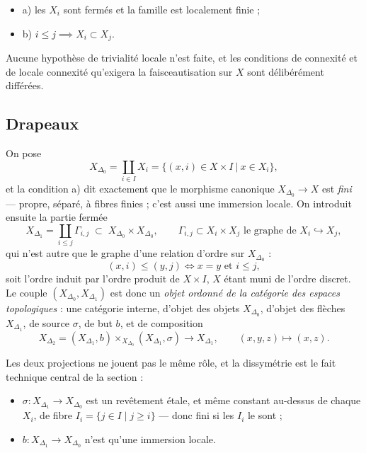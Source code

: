 \documentclass[11pt,a4paper]{article}
\begin{document}
\begin{itemize}
\item a) les $X_{i}$ sont fermés et la famille est localement finie ;
\item b) $i \leq j \implies X_{i} \subset X_{j}$.
\end{itemize}

Aucune hypothèse de trivialité locale n'est faite, et les conditions de connexité
et de locale connexité qu'exigera la faisceautisation sur $X$ sont
délibérément différées.

\subsection*{Drapeaux}

On pose
\[
  X_{\Delta_{0}} = \coprod_{i \in I} X_{i}
  = \bigl\{ (x,i) \in X \times I \ \big|\ x \in X_{i} \bigr\},
\]
et la condition a) dit exactement que le morphisme canonique
$X_{\Delta_{0}} \to X$ est \emph{fini} — propre, séparé, à fibres finies ; c'est
aussi une immersion locale. On introduit ensuite la partie fermée
\[
  X_{\Delta_{1}} = \coprod_{i \leq j} \Gamma_{i,j}
  \;\subset\; X_{\Delta_{0}} \times X_{\Delta_{0}},
  \qquad \Gamma_{i,j} \subset X_{i} \times X_{j}
  \text{ le graphe de } X_{i} \hookrightarrow X_{j},
\]
qui n'est autre que le graphe d'une relation d'ordre sur $X_{\Delta_{0}}$ :
\[
  (x,i) \leq (y,j) \iff x = y \text{ et } i \leq j,
\]
soit l'ordre induit par l'ordre produit de $X \times I$, $X$ étant muni de
l'ordre discret. Le couple $(X_{\Delta_{0}}, X_{\Delta_{1}})$ est donc un
\emph{objet ordonné de la catégorie des espaces topologiques} : une catégorie
interne, d'objet des objets $X_{\Delta_{0}}$, d'objet des flèches
$X_{\Delta_{1}}$, de source $\sigma$, de but $b$, et de composition
\[
  X_{\Delta_{2}} = (X_{\Delta_{1}},b) \times_{X_{\Delta_{0}}}
  (X_{\Delta_{1}},\sigma) \longrightarrow X_{\Delta_{1}},
  \qquad (x,y,z) \mapsto (x,z).
\]

Les deux projections ne jouent pas le même rôle, et la dissymétrie est le fait
technique central de la section :

\begin{itemize}
\item $\sigma \colon X_{\Delta_{1}} \to X_{\Delta_{0}}$ est un revêtement étale,
et même constant au-dessus de chaque $X_{i}$, de fibre
$I_{i} = \{ j \in I \mid j \geq i \}$ — donc fini si les $I_{i}$ le sont ;
\item $b \colon X_{\Delta_{1}} \to X_{\Delta_{0}}$ n'est qu'une immersion locale.
\end{itemize}
\end{document}
